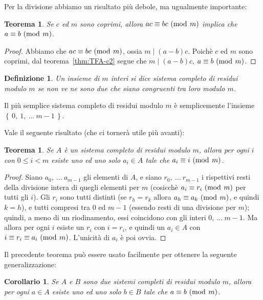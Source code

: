 \documentclass[pdflatex,11pt,a4paper,oneside]{article}
\newcommand{\acro}[1]{\text{{\frenchspacing {#1} }}}
\newcommand{\ie}[0]{\acro{i.e.}}
\newcommand{\p}[1]{\left({#1}\right)}
\newcommand{\divides}[0]{\mid}
\newcommand{\congruent}[0]{\equiv}
\newcommand{\mmodop}[0]{\ensuremath{\operatorname{mod}}}
\newcommand{\mmod}[1]{\ensuremath{\allowbreak\ (\mmodop\:{#1})}}
\newcommand{\set}[1]{\ensuremath{\left\{\,{#1}\,\right\}}}
\newtheorem{theorem}[TheoremLike]{Teorema}
\newtheorem{definition}[TheoremLike]{Definizione}
\newtheorem{corollary}[TheoremLike]{Corollario}
\begin{document}
Per la divisione abbiamo un risultato pi\`u debole, ma ugualmente
importante:
%
\begin{theorem}\label{thm:simplify-modulo-m}
Se $c$ ed $m$ sono coprimi, allora $ac \congruent bc \mmod m$ implica
che $a \congruent b \mmod m$.
\end{theorem}
%
\begin{proof}
Abbiamo che $ac \congruent bc \mmod m$, ossia $m \divides \p{a -b}c$.
Poich\`e $c$ ed $m$ sono coprimi, dal teorema~\eqref{thm:TFA-c2}
segue che $m \divides \p{a -b}c$, \ie $a \congruent b \mmod m$.
\end{proof}

\begin{definition}
Un insieme di $m$ interi si dice \emph{sistema completo di residui modulo
$m$} se non ve ne sono due che siano congruenti tra loro modulo $m$.
\end{definition}

Il pi\`u semplice sistema completo di residui modulo $m$ \`e semplicemente
l'insieme $\set{0,\: 1,\: \ldots\: m - 1}$.

\smallskip
Vale il seguente risultato (che ci torner\`a utile pi\`u avanti):
%
\begin{theorem}\label{thm:complete-residue-system}
Se $A$ \`e un sistema completo di residui modulo $m$, allora per ogni
$i$ con $0 \leq i < m$ esiste uno ed uno solo $a_i \in A$ tale che
$a_i \congruent i \mmod m$.
\end{theorem}
%
\begin{proof}
Siano $a_0,\: \ldots\: a_{m-1}$ gli elementi di $A$, e siano $r_0,\:
\ldots\: r_{m-1}$ i rispettivi resti della divisione intera di quegli
elementi per $m$ (cosicch\`e $a_i \congruent r_i \mmod m$ per tutti
gli $i$).  Gli $r_i$ sono tutti distinti (se $r_h = r_k$ allora
$a_h \congruent a_k \mmod m$, e quindi $k = h$), e tutti compresi tra
$0$ ed $m - 1$ (essendo resti di una divisione per $m$); quindi, a
meno di un riodinamento, essi coincidono con gli interi $0,\: \ldots\:
m -1$.  Ma allora per ogni $i$ esiste un $r_i$ con $i = r_i$, e quindi
un $a_i \in A$ con $i \congruent r_i \congruent a_i \mmod m$.
L'unicit\`a di $a_i$ \`e poi ovvia.
\end{proof}

Il precedente teorema pu\`o essere usato facilmente per ottenere la
seguente generalizzazione:
%
\begin{corollary}
Se $A$ e $B$ sono due sistemi completi di residui modulo $m$, allora per
ogni $a \in A$ esiste uno ed uno solo $b \in B$ tale che $a \congruent b
\mmod m$.
\end{corollary}
\end{document}
